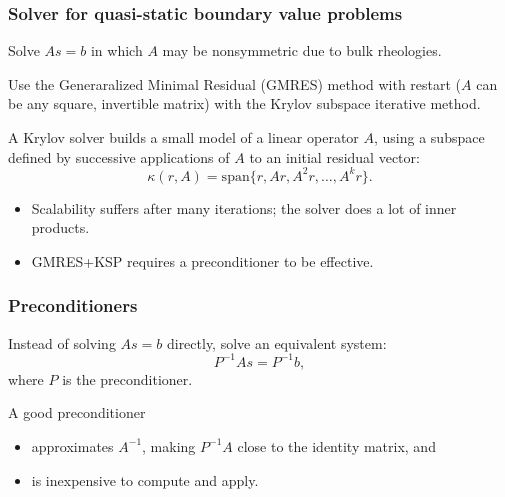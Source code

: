 \documentclass[aspectratio=169]{beamer}
\begin{document}
\begin{frame}[t]
  \frametitle{Solver for quasi-static boundary value problems}
  \summary{}

  Solve $A s = b$ in which $A$ may be nonsymmetric due to bulk rheologies.

  \vfill
  Use the Generaralized Minimal Residual (GMRES) method with restart ($A$ can be any square, invertible matrix) with the Krylov subspace iterative method.

  \vfill
  A Krylov solver builds a small model of a linear operator $A$, using a subspace defined by successive applications of $A$ to an initial residual vector:
  \begin{equation}
    \kappa(r, A) = \text{span}\{r, Ar, A^{2}r, \ldots, A^k r\}.
  \end{equation}\vspace*{-2em}
  \begin{itemize}
    \item Scalability suffers after many iterations; the solver does a lot of inner products.
    \item GMRES+KSP requires a preconditioner to be effective.
  \end{itemize}
  
\end{frame}


\begin{frame}[t]
  \frametitle{Preconditioners}
  \summary{}

  Instead of solving $A s = b$ directly, solve an equivalent system:
  \begin{equation}
    P^{-1} A s = P^{-1} b,
  \end{equation}
  where $P$ is the preconditioner.

  \vfill
  A good preconditioner
  \begin{itemize}
  \item approximates $A^{-1}$, making $P^{-1}A$ close to the identity matrix, and
  \item is inexpensive to compute and apply.
  \end{itemize}
  
\end{frame}
\end{document}

